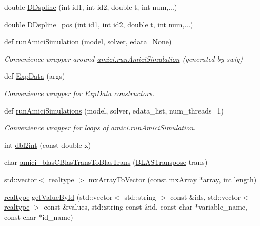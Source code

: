 \begin{DoxyCompactItemize}
\item 
double \mbox{\hyperlink{namespaceamici_a5597be7f476a91dab4b6e948b548e14c}{D\+Dspline}} (int id1, int id2, double t, int num,...)
\item 
double \mbox{\hyperlink{namespaceamici_af6b968fef628d77ae0e9ad63e6e2558b}{D\+Dspline\+\_\+pos}} (int id1, int id2, double t, int num,...)
\item 
def \mbox{\hyperlink{namespaceamici_a9501315e2c79e5787a62c57c05ffe7c0}{run\+Amici\+Simulation}} (model, solver, edata=None)
\begin{DoxyCompactList}\small\item\em Convenience wrapper around \mbox{\hyperlink{namespaceamici_a46331a204e7511587acc2cc0b1ce7ed0}{amici.\+run\+Amici\+Simulation}} (generated by swig) \end{DoxyCompactList}\item 
def \mbox{\hyperlink{namespaceamici_a16e08939fd8d9ac0e61164a1a94acb05}{Exp\+Data}} (args)
\begin{DoxyCompactList}\small\item\em Convenience wrapper for \mbox{\hyperlink{classamici_1_1_exp_data}{Exp\+Data}} constructors. \end{DoxyCompactList}\item 
def \mbox{\hyperlink{namespaceamici_a9fcd2221445c4966d12cd57b4b7f688e}{run\+Amici\+Simulations}} (model, solver, edata\+\_\+list, num\+\_\+threads=1)
\begin{DoxyCompactList}\small\item\em Convenience wrapper for loops of \mbox{\hyperlink{namespaceamici_a46331a204e7511587acc2cc0b1ce7ed0}{amici.\+run\+Amici\+Simulation}}. \end{DoxyCompactList}\item 
int \mbox{\hyperlink{namespaceamici_a204c68962100d0020a37392fef2e95e2}{dbl2int}} (const double x)
\item 
char \mbox{\hyperlink{namespaceamici_a800e4c3e12f712281a4355e765402260}{amici\+\_\+blas\+C\+Blas\+Trans\+To\+Blas\+Trans}} (\mbox{\hyperlink{namespaceamici_a0f0ec77c6c8f48d9c5cb50d54899afae}{B\+L\+A\+S\+Transpose}} trans)
\item 
std\+::vector$<$ \mbox{\hyperlink{namespaceamici_a1bdce28051d6a53868f7ccbf5f2c14a3}{realtype}} $>$ \mbox{\hyperlink{namespaceamici_af8f91dbb6a395a9907c59dd92991ec18}{mx\+Array\+To\+Vector}} (const mx\+Array $\ast$array, int length)
\item 
\mbox{\hyperlink{namespaceamici_a1bdce28051d6a53868f7ccbf5f2c14a3}{realtype}} \mbox{\hyperlink{namespaceamici_a00a3387dd5fe07628c21a763aee28036}{get\+Value\+By\+Id}} (std\+::vector$<$ std\+::string $>$ const \&ids, std\+::vector$<$ \mbox{\hyperlink{namespaceamici_a1bdce28051d6a53868f7ccbf5f2c14a3}{realtype}} $>$ const \&values, std\+::string const \&id, const char $\ast$variable\+\_\+name, const char $\ast$id\+\_\+name)

\end{DoxyCompactItemize}
